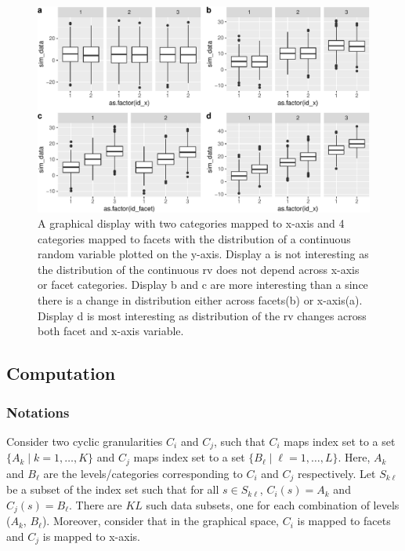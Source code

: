 \documentclass[
]{article}
\begin{document}
\begin{figure}

{\centering \includegraphics[width=\textwidth]{figure/null4by2-1} 

}

\caption{ A graphical display with two categories mapped to x-axis and 4 categories mapped to facets with the distribution of a continuous random variable plotted on the y-axis. Display a is not interesting as the distribution of the continuous rv does not depend across x-axis or facet categories. Display b and c are more interesting than a since there is a change in distribution either across facets(b) or x-axis(a). Display d is most interesting as distribution of the rv changes across both facet and x-axis variable.}\label{fig:null4by2}
\end{figure}

\hypertarget{computation}{%
\subsection{Computation}\label{computation}}

\hypertarget{notations}{%
\subsubsection{Notations}\label{notations}}

Consider two cyclic granularities \(C_i\) and \(C_j\), such that \(C_i\) maps index set to a set \(\{A_k \mid k=1,\dots,K\}\) and \(C_j\) maps index set to a set \(\{B_\ell \mid \ell =1,\dots,L\}\). Here, \(A_k\) and \(B_\ell\) are the levels/categories corresponding to \(C_i\) and \(C_j\) respectively. Let \(S_{k\ell}\) be a subset of the index set such that for all \(s \in S_{k\ell}\), \(C_i(s) = A_k\) and \(C_j(s) = B_\ell\). There are \(KL\) such data subsets, one for each combination of levels (\(A_k\), \(B_\ell\)). Moreover, consider that in the graphical space, \(C_i\) is mapped to facets and \(C_j\) is mapped to x-axis.
\end{document}
